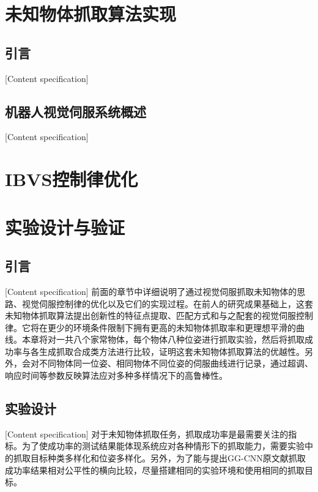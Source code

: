 \documentclass[fontset=fandol,type=bachelor,campus=harbin]{hithesisbook}
\begin{document}
\chapter[未知物体抓取算法实现]{未知物体抓取算法实现}
\section{引言}[Content specification]


\section{机器人视觉伺服系统概述}[Content specification]



\chapter[IBVS控制律优化]{IBVS控制律优化}
\chapter{实验设计与验证}
\section{引言}[Content specification]
前面的章节中详细说明了通过视觉伺服抓取未知物体的思路、视觉伺服控制律的优化以及它们的实现过程。在前人的研究成果基础上，这套未知物体抓取算法提出创新性的特征点提取、匹配方式和与之配套的视觉伺服控制律。它将在更少的环境条件限制下拥有更高的未知物体抓取率和更理想平滑的曲线。本章将对一共八个家常物体，每个物体八种位姿进行抓取实验，然后将抓取成功率与各生成抓取合成类方法进行比较，证明这套未知物体抓取算法的优越性。另外，会对不同物体同一位姿、相同物体不同位姿的伺服曲线进行记录，通过超调、响应时间等参数反映算法应对多种多样情况下的高鲁棒性。

\section{实验设计}[Content specification]
对于未知物体抓取任务，抓取成功率是最需要关注的指标。为了使成功率的测试结果能体现系统应对各种情形下的抓取能力，需要实验中的抓取目标种类多样化和位姿多样化。另外，为了能与提出GG-CNN原文献抓取成功率结果相对公平性的横向比较，尽量搭建相同的实验环境和使用相同的抓取目标。
\end{document}
